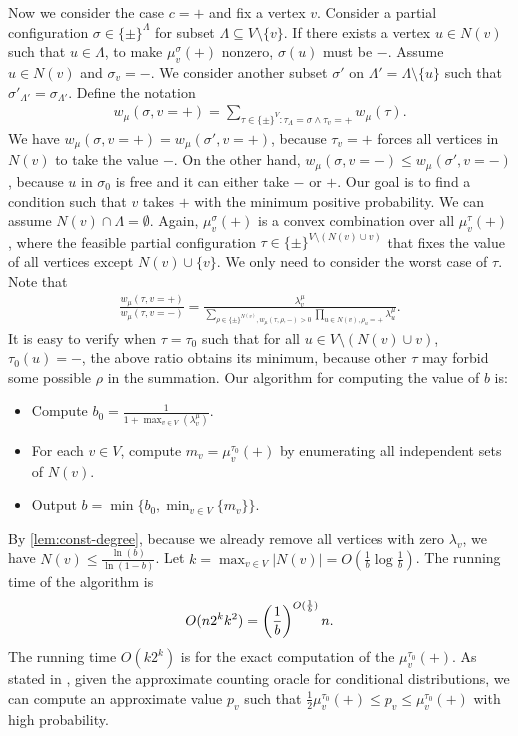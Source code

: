 Now we consider the case $c = +$ and fix a vertex $v$. Consider a partial configuration $\sigma\in \{\pm\}^\Lambda$ for subset $\Lambda \subseteq V\setminus \{v\}$. If there exists a vertex $u\in N(v)$ such that $u\in \Lambda$, to make $\mu_v^\sigma(+)$ nonzero, $\sigma(u)$ must be $-$. 
Assume $u \in N(v)$ and $\sigma_v = -$.
We consider another subset $\sigma'$ on $\Lambda' = \Lambda \setminus \{u\}$ such that $\sigma'_{\Lambda'} = \sigma_{\Lambda'}$. Define the notation
\begin{align*}
    w_\mu(\sigma,v = +) = \sum_{\tau \in \{\pm\}^V:\tau_\Lambda  = \sigma \land \tau_v = +} w_\mu(\tau).
\end{align*}
We have $w_\mu(\sigma,v = +) = w_\mu(\sigma',v = +)$, because $\tau_v = +$ forces all vertices in $N(v)$ to take the value $-$. On the other hand, $w_\mu(\sigma,v = -) \leq w_\mu(\sigma',v = -)$, because $u$ in $\sigma_0$ is free and it can either take $-$ or $+$.
Our goal is to find a condition such that $v$ takes $+$ with the minimum positive probability. We can assume $N(v) \cap \Lambda = \emptyset$.
Again, $\mu^\sigma_v(+)$ is a convex combination over all $\mu^\tau_v(+)$, where the feasible partial configuration $\tau \in \{\pm\}^{V\setminus (N(v)\cup v)}$ that fixes the value of all vertices except $N(v) \cup \{v\}$. We only need to consider the worst case of $\tau$. Note that
\begin{align*}
    \frac{w_\mu(\tau,v=+)}{w_\mu(\tau,v=-)} = \frac{\lambda_v^\mu}{\sum_{\rho \in \{\pm\}^{N(v)},w_\mu(\tau,\rho,-)>0 }\prod_{u\in N(v),\rho_u=+}\lambda_u^\mu}.
\end{align*}
It is easy to verify when $\tau = \tau_0$ such that for all $u \in {V\setminus (N(v)\cup v)}$, $\tau_0(u)= -$,
the above ratio obtains its minimum, because other $\tau$ may forbid some possible $\rho$ in the summation. Our algorithm for computing the value of $b$ is:
\begin{itemize}
    \item Compute $b_0=\frac{1}{1+\max_{v\in V}(\lambda_v^\mu)}$.
    \item For each $v\in V$, compute $m_v=\mu_{v}^{\tau_0}(+)$ by enumerating all independent sets of $N(v)$.
    \item Output $b=\min \{b_0,\min_{v\in V} \{m_v\}\}$.
\end{itemize}

By \cref{lem:const-degree}, because we already remove all vertices with zero $\lambda_v$, we have $N(v)\leq \frac{\ln(b)}{\ln (1-b)}$.
Let $k = \max_{v \in V}|N(v)| = O(\frac{1}{b}\log \frac{1}{b})$. 
The running time of the algorithm is 
\[O(n 2^k k^2) = \left(\frac{1}{b}\right)^{O(\frac{1}{b})} n.\] 
The running time $O(k2^k)$ is for the exact computation of the $\mu^{\tau_0}_v(+)$. As stated in , given the approximate counting oracle for conditional distributions, we can compute an approximate value $p_v$ such that $\frac{1}{2} \mu^{\tau_0}_v(+) \leq p_v \leq \mu^{\tau_0}_v(+)$ with high probability.

